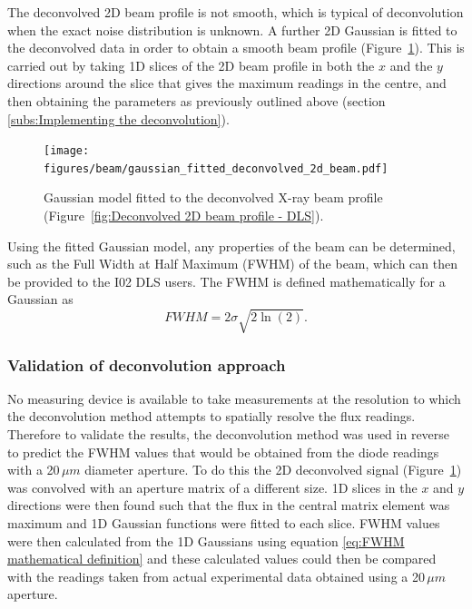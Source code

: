 The deconvolved 2D beam profile is not smooth, which is typical of deconvolution when the exact noise distribution is unknown.
A further 2D Gaussian is fitted to the deconvolved data in order to obtain a smooth beam profile (Figure~\ref{fig:Gaussian model fitted to the 2D deconvolved profile - DLS}).
This is carried out by taking 1D slices of the 2D beam profile in both the $x$ and the $y$ directions around the slice that gives the maximum readings in the centre, and then obtaining the parameters as previously outlined above (section \ref{subs:Implementing the deconvolution}).
\begin{figure}
    \centering
    \texttt{[image: figures/beam/gaussian\_fitted\_deconvolved\_2d\_beam.pdf]}
    \caption[Gaussian model fitted to the deconvolved X-ray beam profile.]{Gaussian model fitted to the deconvolved X-ray beam profile (Figure~\ref{fig:Deconvolved 2D beam profile - DLS}).}
    \label{fig:Gaussian model fitted to the 2D deconvolved profile - DLS}
\end{figure}

Using the fitted Gaussian model, any properties of the beam can be determined, such as the Full Width at Half Maximum (FWHM) of the beam, which can then be provided to the I02 DLS users.
The FWHM is defined mathematically for a Gaussian as
\begin{equation}
FWHM = 2 \sigma \sqrt{2\ln(2)}.
\label{eq:FWHM mathematical definition}
\end{equation}

\subsubsection{Validation of deconvolution approach}
\label{subs:Validation of deconvolution approach}
No measuring device is available to take measurements at the resolution to which the deconvolution method attempts to spatially resolve the flux readings.
Therefore to validate the results, the deconvolution method was used in reverse to predict the FWHM values that would be obtained from the diode readings with a 20$\,\mu m$ diameter aperture.
To do this the 2D deconvolved signal (Figure~\ref{fig:Gaussian model fitted to the 2D deconvolved profile - DLS}) was convolved with an aperture matrix of a different size.
1D slices in the $x$ and $y$ directions were then found such that the flux in the central matrix element was maximum and 1D Gaussian functions were fitted to each slice.
FWHM values were then calculated from the 1D Gaussians using equation \ref{eq:FWHM mathematical definition} and these calculated values could then be compared with the readings taken from actual experimental data obtained using a 20$\,\mu m$ aperture.

